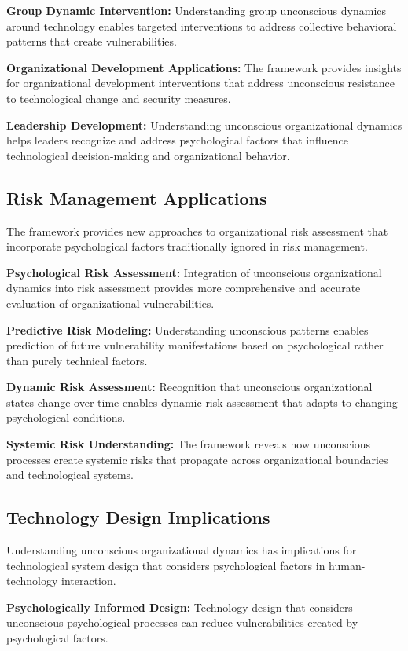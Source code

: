 \documentclass[10pt, twocolumn]{article}
\begin{document}
\textbf{Group Dynamic Intervention:} Understanding group unconscious dynamics around technology enables targeted interventions to address collective behavioral patterns that create vulnerabilities.

\textbf{Organizational Development Applications:} The framework provides insights for organizational development interventions that address unconscious resistance to technological change and security measures.

\textbf{Leadership Development:} Understanding unconscious organizational dynamics helps leaders recognize and address psychological factors that influence technological decision-making and organizational behavior.

\subsection{Risk Management Applications}

The framework provides new approaches to organizational risk assessment that incorporate psychological factors traditionally ignored in risk management.

\textbf{Psychological Risk Assessment:} Integration of unconscious organizational dynamics into risk assessment provides more comprehensive and accurate evaluation of organizational vulnerabilities.

\textbf{Predictive Risk Modeling:} Understanding unconscious patterns enables prediction of future vulnerability manifestations based on psychological rather than purely technical factors.

\textbf{Dynamic Risk Assessment:} Recognition that unconscious organizational states change over time enables dynamic risk assessment that adapts to changing psychological conditions.

\textbf{Systemic Risk Understanding:} The framework reveals how unconscious processes create systemic risks that propagate across organizational boundaries and technological systems.

\subsection{Technology Design Implications}

Understanding unconscious organizational dynamics has implications for technological system design that considers psychological factors in human-technology interaction.

\textbf{Psychologically Informed Design:} Technology design that considers unconscious psychological processes can reduce vulnerabilities created by psychological factors.
\end{document}
